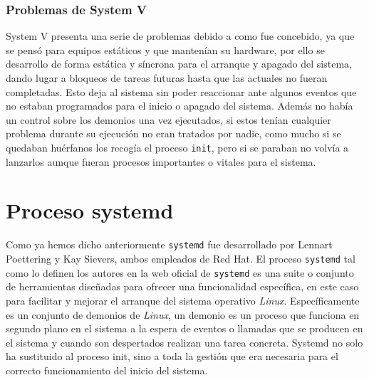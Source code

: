 \subsubsection{Problemas de System V}
System V presenta una serie de problemas debido a como fue concebido, ya que se pensó para equipos estáticos y que mantenían su hardware, por ello se desarrollo de forma estática y síncrona para el arranque y apagado del sistema, dando lugar a bloqueos de tareas futuras hasta que las actuales no fueran completadas. Esto deja al sistema sin poder reaccionar ante algunos eventos que no estaban programados para el inicio o apagado del sistema. Además no había un control sobre los demonios una vez ejecutados, si estos tenían cualquier problema durante su ejecución no eran tratados por nadie, como mucho si se quedaban huérfanos los recogía el proceso \texttt{init}, pero si se paraban no volvía a lanzarlos aunque fueran procesos importantes o vitales para el sistema.

\section{Proceso systemd} %

Como ya hemos dicho anteriormente \texttt{systemd} fue desarrollado por Lennart Poettering y Kay Sievers, ambos empleados de Red Hat.
El proceso \texttt{systemd} tal como lo definen los autores en la web oficial de \texttt{systemd} \cite{systemd} es una suite o conjunto de herramientas diseñadas para ofrecer una funcionalidad específica, en este caso para facilitar y mejorar el arranque del sistema operativo \textit{Linux}. Específicamente es un conjunto de demonios de \textit{Linux}, un demonio \cite{daemons} es un proceso que funciona en segundo plano en el sistema a la espera de eventos o llamadas que se producen en el sistema y cuando son despertados realizan una tarea concreta. Systemd no solo ha sustituido al proceso init, sino a toda la gestión que era necesaria para el correcto funcionamiento del inicio del sistema.\\

